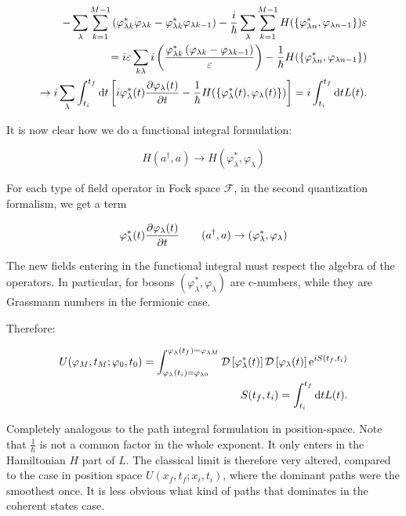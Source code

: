  \begin{align*}
     -\sum_{\lambda} \sum_{k = 1}^{M-1}\left(\varphi_{\lambda k}^{*} \varphi_{\lambda k} - \varphi_{\lambda k}^{*} \varphi_{\lambda k - 1}\right) -\frac{i}{\hbar} \sum_{\lambda} \sum_{k = 1}^{M-1} H(\{\varphi_{\lambda n}^{*}, \varphi_{\lambda n-1}\} ) \varepsilon \\ 
     = i\varepsilon \sum_{k\lambda} i\left(\frac{\varphi_{\lambda k}^{*}\left(\varphi_{\lambda k} - \varphi_{\lambda k - 1}\right)}{\varepsilon}\right)- \frac{1}{\hbar}H(\{\varphi_{\lambda n}^{*}, \varphi_{\lambda n-1}\} ) \\ \to i \sum_{\lambda} \int_{t_{i}}^{t_{f}} \dd t \left[ i \varphi_{\lambda}^{*}(t) \pdv{\varphi_{\lambda}(t)}{t} - \frac{1}{\hbar}H(\{\varphi_{\lambda}^{*}(t), \varphi_{\lambda} (t)\} )  \right] = i\int_{t_{i}}^{t_{f}} \dd t L(t).
 \end{align*}
 
 It is now clear how we do a functional integral formulation: 
 
 \begin{equation*}
     H(a^{\dagger}, a) \to H(\varphi_{\lambda}^{*}, \varphi_{\lambda})
 \end{equation*}
 
 For each type of field operator in Fock space \(\mathcal{F}\), in the second quantization formalism, we get a term 
 
 \begin{equation*}
     \varphi_{\lambda}^{*}(t) \pdv{\varphi_{\lambda}(t)}{t} \quad \quad (a^{\dagger}, a) \to (\varphi_{\lambda}^{*}, \varphi_{\lambda})
 \end{equation*}
 
 The new fields entering in the functional integral must respect the algebra of the operators. In particular, for bosons $(\varphi_{\lambda}^{*}, \varphi_{\lambda})$ are c-numbers, while they are Grassmann numbers in the fermionic case. 
 
Therefore: 

\begin{align*}
    U(\varphi_{M} ,t_{M} ; \varphi_{0}, t_{0}) = \int_{\varphi_{\lambda}(t_{i}) = \varphi_{\lambda 0}}^{\varphi_{\lambda}(t_{f}) = \varphi_{\lambda M}} \mathcal{D} \left[\varphi_{\lambda}^{*}(t)\right] \mathcal{D} \left[ \varphi_{\lambda} (t)\right] \mathrm{e}^{iS(t_{f}, t_{i})} \\
    S(t_{f}, t_{i}) = \int_{t_{i}}^{t_{f}} \dd t L(t). 
\end{align*}

Completely analogous to the path integral formulation in position-space. Note that $\frac{1}{\hbar}$ is not a common factor in the whole exponent. It only enters in the Hamiltonian $H$ part of $L$. The classical limit is therefore very altered, compared to the case in position space $U(x_{f}, t_{f} ; x_{i}, t_{i})$, where the dominant paths were the smoothest once. It is less obvious what kind of paths that dominates in the coherent states case. \\

